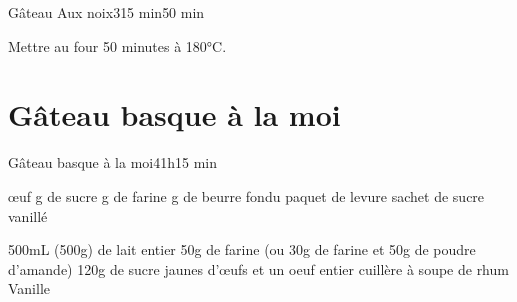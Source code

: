 {\begin{recette}{Gâteau Aux noix}{3}{15 min}{50 min}
\begin{cuisson}
Mettre au four 50 minutes à 180°C.
\end{cuisson}
\end{recette}


\section{Gâteau basque à la moi}
\begin{recette}{Gâteau basque à la moi}{4}{1h}{15 min}
\begin{ingredients}
\ingredient[pâte]
 œuf
 g de sucre
 g de farine
 g de beurre fondu
 paquet de levure
 sachet de sucre vanillé
\ingredient[crème]

\ingredient 500mL (500g) de lait entier
\ingredient 50g de farine (ou 30g de farine et 50g de poudre d'amande)
\ingredient 120g de sucre
 jaunes d'œufs et un oeuf entier
 cuillère à soupe de rhum
\ingredient Vanille
\end{ingredients}


\end{recette}}

